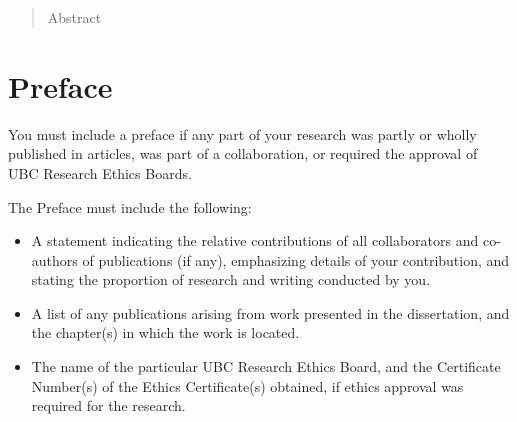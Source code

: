 \frontmatter


\maketitle                      %
\begin{abstract}                %
Abstract
\end{abstract}

\chapter{Preface} %

You must include a preface if any part of your research was partly or
wholly published in articles, was part of a collaboration, or required
the approval of UBC Research Ethics Boards.

The Preface must include the following:

\begin{itemize}
\item A statement indicating the relative contributions of all
  collaborators and co-authors of publications (if any), emphasizing
  details of your contribution, and stating the proportion of research
  and writing conducted by you.
\item A list of any publications arising from work presented in the
  dissertation, and the chapter(s) in which the work is located.
\item The name of the particular UBC Research Ethics Board, and the
  Certificate Number(s) of the Ethics Certificate(s) obtained, if
  ethics approval was required for the research.
\end{itemize}

